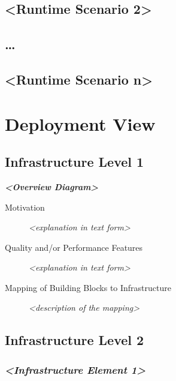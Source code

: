 \documentclass[
]{article}
\begin{document}
\hypertarget{__runtime_scenario_2}{%
\subsection{\textless Runtime Scenario
2\textgreater{}}\label{__runtime_scenario_2}}

\hypertarget{_}{%
\subsection{\ldots{}}\label{_}}

\hypertarget{__runtime_scenario_n}{%
\subsection{\textless Runtime Scenario
n\textgreater{}}\label{__runtime_scenario_n}}

\hypertarget{section-deployment-view}{%
\section{Deployment View}\label{section-deployment-view}}

\hypertarget{_infrastructure_level_1}{%
\subsection{Infrastructure Level 1}\label{_infrastructure_level_1}}

\emph{\textbf{\textless Overview Diagram\textgreater{}}}

\begin{description}
\item[Motivation]
\emph{\textless explanation in text form\textgreater{}}
\item[Quality and/or Performance Features]
\emph{\textless explanation in text form\textgreater{}}
\item[Mapping of Building Blocks to Infrastructure]
\emph{\textless description of the mapping\textgreater{}}
\end{description}

\hypertarget{_infrastructure_level_2}{%
\subsection{Infrastructure Level 2}\label{_infrastructure_level_2}}

\hypertarget{__emphasis_infrastructure_element_1_emphasis}{%
\subsubsection{\texorpdfstring{\emph{\textless Infrastructure Element
1\textgreater{}}}{\textless Infrastructure Element 1\textgreater{}}}\label{__emphasis_infrastructure_element_1_emphasis}}
\end{document}
